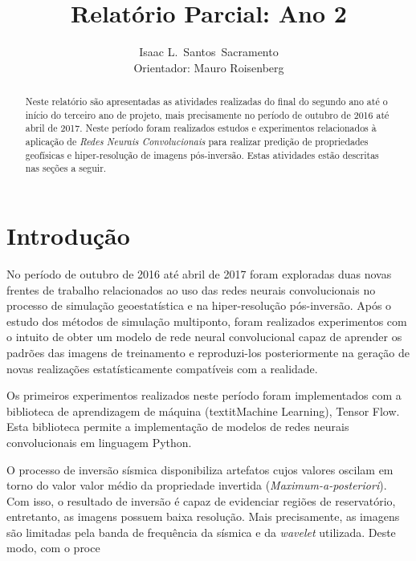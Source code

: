 \documentclass[11pt]{article}
\title{Relatório Parcial: Ano 2}
\author{Isaac L.\ Santos\ Sacramento \\ Orientador: Mauro Roisenberg}
\begin{document}
\lstset{language=C++,basicstyle=\small,
        stringstyle=\ttfamily,showstringspaces=false}

\singlespace
\maketitle

\begin{abstract}                %
Neste relatório são apresentadas as atividades realizadas do final do segundo ano até o início do terceiro ano de projeto, mais precisamente no
período de outubro de 2016 até abril de 2017. Neste período foram realizados estudos e experimentos relacionados à aplicação
de \textit{Redes Neurais Convolucionais} para realizar predição de propriedades geofísicas e hiper-resolução de imagens pós-inversão.
Estas atividades estão descritas nas seções a seguir.

\end{abstract}

\doublespace
\setcounter{secnumdepth}{2}

\section{Introdução}

No período de outubro de 2016 até abril de 2017 foram exploradas duas novas frentes de trabalho relacionados ao uso
das redes neurais convolucionais no processo de simulação geoestatística e na hiper-resolução pós-inversão.
Após o estudo dos métodos de simulação multiponto, foram realizados experimentos com o intuito de obter um modelo de rede neural convolucional
capaz de aprender os padrões das imagens de treinamento e reproduzi-los posteriormente na geração de novas realizações estatísticamente compatíveis
com a realidade.

Os primeiros experimentos realizados neste período foram implementados 
com a biblioteca de aprendizagem de máquina (textit{Machine Learning}),
Tensor Flow. Esta biblioteca permite a implementação de modelos de redes
neurais convolucionais em linguagem Python.

O processo de inversão sísmica disponibiliza artefatos cujos valores oscilam em torno
do valor valor médio da propriedade invertida (\textit{Maximum-a-posteriori}). Com isso,
o resultado de inversão é capaz de evidenciar regiões de reservatório, entretanto,
as imagens possuem baixa resolução. Mais precisamente, as imagens são limitadas
pela banda de frequência da sísmica e da \textit{wavelet} utilizada. Deste modo,
com o proce
\end{document}
